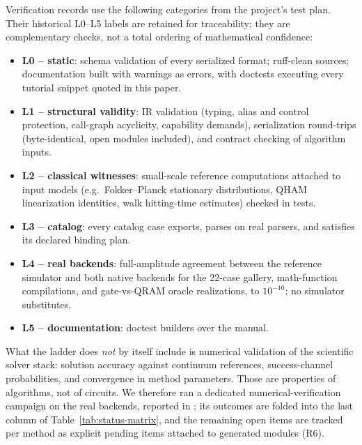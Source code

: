 Verification records use the following categories from the project's
test plan. Their historical L0--L5 labels are retained for traceability;
they are complementary checks, not a total ordering of mathematical
confidence:

\begin{itemize}
\item \textbf{L0 -- static}: schema validation of every serialized format;
  ruff-clean sources; documentation built with warnings as errors, with
  doctests executing every tutorial snippet quoted in this paper.
\item \textbf{L1 -- structural validity}: IR validation (typing, alias and
  control protection, call-graph acyclicity, capability demands),
  serialization round-trips (byte-identical, open modules included), and
  contract checking of algorithm inputs.
\item \textbf{L2 -- classical witnesses}: small-scale reference computations
  attached to input models (e.g.\ Fokker--Planck stationary distributions,
  QHAM linearization identities, walk hitting-time estimates) checked in
  tests.
\item \textbf{L3 -- catalog}: every catalog case exports, parses on real
  parsers, and satisfies its declared binding plan.
\item \textbf{L4 -- real backends}: full-amplitude agreement between the
  reference simulator and both native backends for the 22-case gallery,
  math-function compilations, and gate-vs-QRAM oracle realizations, to
  $10^{-10}$; no simulator substitutes.
\item \textbf{L5 -- documentation}: doctest builders over the manual.
\end{itemize}

What the ladder does \emph{not} by itself include is numerical validation
of the scientific solver stack: solution accuracy against continuum
references, success-channel probabilities, and convergence in method
parameters.  Those are properties of algorithms, not of circuits.  We
therefore ran a dedicated numerical-verification campaign on the real
backends, reported in ; its outcomes are folded into
the last column of Table~\ref{tab:status-matrix}, and the remaining
open items are tracked per method as explicit pending items attached to
generated modules (R6).

